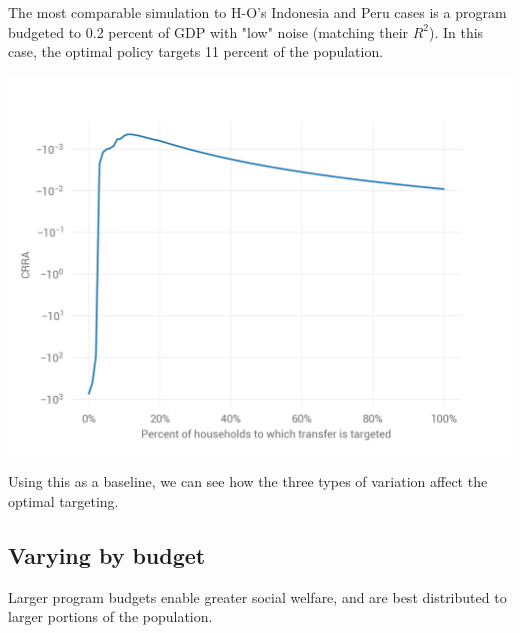 \documentclass[12pt]{article}
\begin{document}
The most comparable simulation to H-O's Indonesia and Peru cases is a program 
budgeted to 0.2 percent of GDP with "low" noise (matching their $R^2$). In this 
case, the optimal policy targets 11 percent of the population. 

\begin{center}
\includegraphics{single_plot_0_2_0_Low_noise}  %
\label{fig:single_plot_0_2_0_Low_noise}
\end{center}


Using this as a baseline, we can see how the three types of variation affect 
the optimal targeting.

\subsection{Varying by budget} \label{varying_by_budget}

Larger program budgets enable greater social welfare, and are best distributed 
to larger portions of the population.
\end{document}
